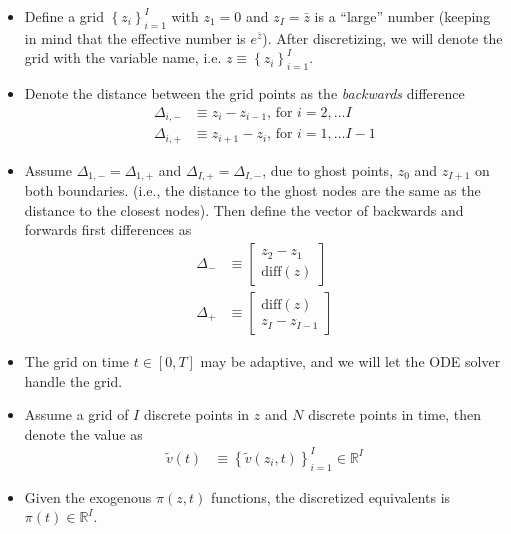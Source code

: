 \documentclass[11pt]{article}
\newcommand{\R}{\ensuremath{\mathbb{R}}}
\newcommand{\diff}{\ensuremath{\mathrm{d}}}
\newcommand{\set}[1]{\ensuremath{\left\{{#1}\right\}}}
\begin{document}
\begin{itemize}
	\item Define a  grid $\set{z_i}_{i=1}^I$ with $z_1 = 0$ and $z_I = \bar{z}$ is a ``large'' number (keeping in mind that the effective number is $e^{\bar{z}}$).  After discretizing, we will denote the grid with the variable name, i.e. $z \equiv \set{z_i}_{i=1}^I$.
	\item Denote the distance between the grid points as the \textit{backwards} difference
	\begin{align}
			\Delta_{i,-} &\equiv z_i - z_{i-1},\, \text{for } i = 2,\ldots I\\
			\Delta_{i,+} &\equiv z_{i+1} - z_i,\, \text{for } i = 1,\ldots I-1
	\end{align}
	\item Assume $\Delta_{1, -} = \Delta_{1, +}$ and $\Delta_{I, +} = \Delta_{I, -}$, due to ghost points, $z_0$ and $z_{I+1}$ on both boundaries. (i.e., the distance to the ghost nodes are the same as the distance to the closest nodes).  Then define the vector of backwards and forwards first differences as
	\begin{align}
		\Delta_{-} &\equiv \begin{bmatrix} z_2 - z_1 \\
			\text{diff}(z)
		\end{bmatrix}\\
		\Delta_{+} &\equiv \begin{bmatrix} \text{diff}(z)\\
			z_I - z_{I-1}
		\end{bmatrix}
	\end{align}
	\item The grid on time $t \in [0,T]$ may be adaptive, and we will let the ODE solver handle the grid.	
	\item Assume a grid of $I$ discrete points in $z$ and $N$ discrete points in time, then denote the value as
	\begin{align}
		\tilde{v}(t) &\equiv \set{\tilde{v}(z_i, t)}_{i=1}^I\in\R^I
	\end{align}
\item Given the exogenous $\pi(z,t)$ functions, the discretized equivalents is $\pi(t) \in \R^I$.
\end{itemize}
\end{document}
